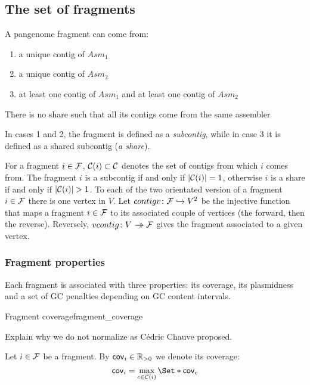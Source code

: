 \subsection{The set of fragments}

A pangenome fragment can come from:

\begin{enumerate}
  \item a unique contig of \(Asm_1\)

  \item a unique contig of \(Asm_2\)

  \item at least one contig of \(Asm_1\) and at least one contig of \(Asm_2\)
\end{enumerate}

\begin{missingproofbox}
  There is no share such that all its contigs come from the same assembler
\end{missingproofbox}

In cases 1 and 2, the fragment is defined as a \emph{subcontig}, while in case 3 it is defined as a shared subcontig (\emph{a share}).

For a fragment \(i \in \mathcal{F}{}\), \(\mathcal{C}{}(i) \subset \mathcal{C}{}\) denotes the set of contigs from which \(i\) comes from.
The fragment \(i\) is a subcontig if and only if \(|\mathcal{C}{}(i)| = 1\), otherwise \(i\) is a share if and only if \(|\mathcal{C}{}(i)| > 1\).
To each of the two orientated version of a fragment \(i \in \mathcal{F}{}\) there is one vertex in \(V\).
Let \(contigv \colon \mathcal{F}{} \hookrightarrow V^2\) be the injective function that maps a fragment \(i \in \mathcal{F}{}\) to its associated couple of vertices (the forward, then the reverse).
Reversely, \(vcontig \colon V \rightarrow\mathrel{\mspace{-15mu}}\rightarrow \mathcal{F}{}\) gives the fragment associated to a given vertex.

\subsubsection{Fragment properties}

Each fragment is associated with three properties: its coverage, its plasmidness and a set of GC penalties depending on GC content intervals.

\begin{definition}{Fragment coverage}{fragment_coverage}
  \begin{todobox}
    Explain why we do not normalize as Cédric Chauve proposed.
  \end{todobox}
  Let \(i \in \mathcal{F}{}\) be a fragment.
  By \(\mathsf{cov}_{i} \in \mathbb{R}{}_{>0}\) we denote its coverage:
  \[
    \cov{i} = \max_{c \in \Contigs{}(i)}\Set*{\cov{c}}
  \]
\end{definition}

